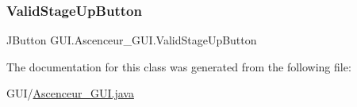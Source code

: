 \subsubsection{\texorpdfstring{ValidStageUpButton}{ValidStageUpButton}}
{\footnotesize\ttfamily J\+Button G\+U\+I.\+Ascenceur\+\_\+\+G\+U\+I.\+Valid\+Stage\+Up\+Button\hspace{0.3cm}{\ttfamily [private]}}



The documentation for this class was generated from the following file\+:\begin{DoxyCompactItemize}
\item 
G\+U\+I/\mbox{\hyperlink{_ascenceur___g_u_i_8java}{Ascenceur\+\_\+\+G\+U\+I.\+java}}\end{DoxyCompactItemize}

